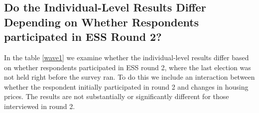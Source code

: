 \documentclass[12pt,a4paper]{article}
\begin{document}
	
	
	
		\subsection{Do the Individual-Level Results Differ Depending on Whether Respondents participated in ESS Round 2?} \label{waves}
	\setcounter{table}{0}
	\setcounter{figure}{0}
	
	In the table \ref{wave1} we examine whether the individual-level results differ based on whether respondents participated in ESS round 2, where the last election was not held right before the survey ran. To do this we include an interaction between whether the respondent initially participated in round 2 and changes in housing prices. The results are not substantially or significantly different for those interviewed in round 2.
	
	
	
	
	
	
\end{document}
